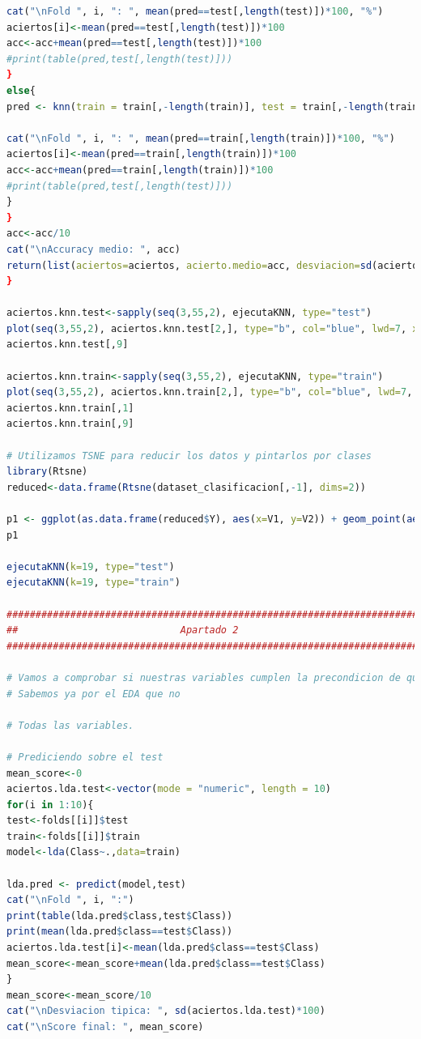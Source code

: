 \documentclass[12pt,a4paper]{article}
\begin{document}
\begin{lstlisting}[basicstyle=\tiny, language=R]
cat("\nFold ", i, ": ", mean(pred==test[,length(test)])*100, "%")
aciertos[i]<-mean(pred==test[,length(test)])*100
acc<-acc+mean(pred==test[,length(test)])*100
#print(table(pred,test[,length(test)]))
}
else{
pred <- knn(train = train[,-length(train)], test = train[,-length(train)], cl = train[,length(train)], k=k)

cat("\nFold ", i, ": ", mean(pred==train[,length(train)])*100, "%")
aciertos[i]<-mean(pred==train[,length(train)])*100
acc<-acc+mean(pred==train[,length(train)])*100
#print(table(pred,test[,length(test)]))
}
}
acc<-acc/10
cat("\nAccuracy medio: ", acc)
return(list(aciertos=aciertos, acierto.medio=acc, desviacion=sd(aciertos)))
}

aciertos.knn.test<-sapply(seq(3,55,2), ejecutaKNN, type="test")
plot(seq(3,55,2), aciertos.knn.test[2,], type="b", col="blue", lwd=7, xlab="Valores de K", ylab="Porcentaje de acierto", main = "Acierto vs K para test")
aciertos.knn.test[,9]

aciertos.knn.train<-sapply(seq(3,55,2), ejecutaKNN, type="train")
plot(seq(3,55,2), aciertos.knn.train[2,], type="b", col="blue", lwd=7, xlab="Valores de K", ylab="Porcentaje de acierto", main = "Acierto vs K para train")
aciertos.knn.train[,1]
aciertos.knn.train[,9]

# Utilizamos TSNE para reducir los datos y pintarlos por clases
library(Rtsne)
reduced<-data.frame(Rtsne(dataset_clasificacion[,-1], dims=2))

p1 <- ggplot(as.data.frame(reduced$Y), aes(x=V1, y=V2)) + geom_point(aes(col=factor(dataset_clasificacion$Class))) + theme(axis.title.y = element_blank())
p1

ejecutaKNN(k=19, type="test")
ejecutaKNN(k=19, type="train")

###########################################################################
##                            Apartado 2                                 ##
###########################################################################

# Vamos a comprobar si nuestras variables cumplen la precondicion de que son normales
# Sabemos ya por el EDA que no

# Todas las variables.

# Prediciendo sobre el test
mean_score<-0
aciertos.lda.test<-vector(mode = "numeric", length = 10)
for(i in 1:10){
test<-folds[[i]]$test
train<-folds[[i]]$train
model<-lda(Class~.,data=train)

lda.pred <- predict(model,test)
cat("\nFold ", i, ":")
print(table(lda.pred$class,test$Class))
print(mean(lda.pred$class==test$Class))
aciertos.lda.test[i]<-mean(lda.pred$class==test$Class)
mean_score<-mean_score+mean(lda.pred$class==test$Class)
}
mean_score<-mean_score/10
cat("\nDesviacion tipica: ", sd(aciertos.lda.test)*100)
cat("\nScore final: ", mean_score)


\end{lstlisting}
\end{document}
